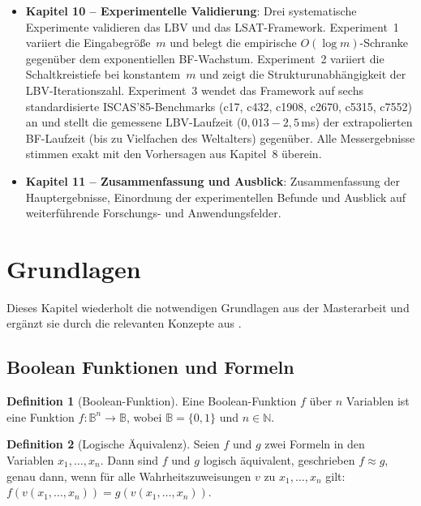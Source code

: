 ﻿\documentclass[a4paper,12pt]{article}
\theoremstyle{definition}
\newtheorem{definition}{Definition}
\begin{document}
\begin{itemize}
    \item[-] \textbf{Kapitel 10 -- Experimentelle Validierung}: Drei systematische
      Experimente validieren das LBV und das LSAT-Framework.  Experiment~1 variiert
      die Eingabegröße~$m$ und belegt die empirische $O(\log m)$-Schranke gegenüber
      dem exponentiellen BF-Wachstum.  Experiment~2 variiert die Schaltkreistiefe bei
      konstantem~$m$ und zeigt die Strukturunabhängigkeit der
      LBV-Iterationszahl.  Experiment~3 wendet das Framework auf sechs standardisierte
      ISCAS'85-Benchmarks (c17, c432, c1908, c2670, c5315, c7552) an und stellt die
      gemessene LBV-Laufzeit ($0{,}013{-}2{,}5$\,ms) der extrapolierten BF-Laufzeit
      (bis zu Vielfachen des Weltalters) gegenüber.  Alle Messergebnisse stimmen
      exakt mit den Vorhersagen aus Kapitel~8 überein.

    \item[-] \textbf{Kapitel 11 -- Zusammenfassung und Ausblick}: Zusammenfassung der
      Hauptergebnisse, Einordnung der experimentellen Befunde und Ausblick auf
      weiterführende Forschungs- und Anwendungsfelder.
\end{itemize}

\section{Grundlagen}

Dieses Kapitel wiederholt die notwendigen Grundlagen aus der Masterarbeit \cite{Epp13} und ergänzt sie durch die relevanten Konzepte aus \cite{Epp26, Epp26}.

\subsection{Boolean Funktionen und Formeln}

\begin{definition}[Boolean-Funktion]
    Eine Boolean-Funktion $f$ über $n$ Variablen ist eine Funktion $f: \mathbb{B}^n \to \mathbb{B}$, wobei $\mathbb{B} = \{0, 1\}$ und $n \in \mathbb{N}$.
\end{definition}

\begin{definition}[Logische Äquivalenz]
    Seien $f$ und $g$ zwei Formeln in den Variablen $x_1, \ldots, x_n$. Dann sind $f$ und $g$ logisch äquivalent, geschrieben $f \approx g$, genau dann, wenn für alle Wahrheitszuweisungen $v$ zu $x_1, \ldots, x_n$ gilt: $f(v(x_1, \ldots, x_n)) = g(v(x_1, \ldots, x_n))$.
\end{definition}
\end{document}
